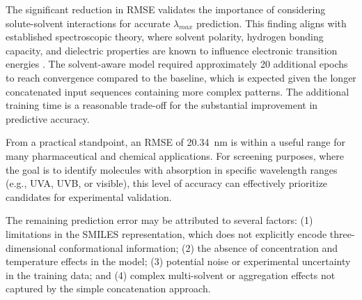 \documentclass[11pt,a4paper]{article}
\begin{document}
The significant reduction in RMSE validates the importance of considering solute-solvent interactions for accurate $\lambda_{max}$ prediction. This finding aligns with established spectroscopic theory, where solvent polarity, hydrogen bonding capacity, and dielectric properties are known to influence electronic transition energies \cite{reichardt2011solvents, abraham1993scales}. The solvent-aware model required approximately 20 additional epochs to reach convergence compared to the baseline, which is expected given the longer concatenated input sequences containing more complex patterns. The additional training time is a reasonable trade-off for the substantial improvement in predictive accuracy.

From a practical standpoint, an RMSE of 20.34~nm is within a useful range for many pharmaceutical and chemical applications. For screening purposes, where the goal is to identify molecules with absorption in specific wavelength ranges (e.g., UVA, UVB, or visible), this level of accuracy can effectively prioritize candidates for experimental validation.

The remaining prediction error may be attributed to several factors: (1) limitations in the SMILES representation, which does not explicitly encode three-dimensional conformational information; (2) the absence of concentration and temperature effects in the model; (3) potential noise or experimental uncertainty in the training data; and (4) complex multi-solvent or aggregation effects not captured by the simple concatenation approach.
\end{document}
